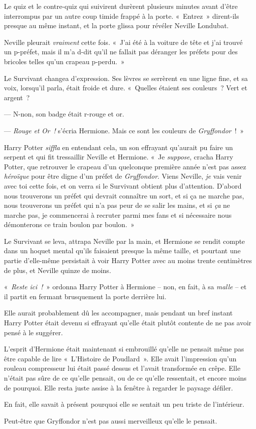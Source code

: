 Le quiz et le contre-quiz qui suivirent durèrent plusieurs minutes avant d'être interrompus par un autre coup timide frappé à la porte.
«~Entrez~» dirent-ils presque au même instant, et la porte glissa pour révéler Neville Londubat.

Neville pleurait \emph{vraiment} cette fois.
«~J'ai été à la voiture de tête et j'ai trouvé un p-préfet, mais il m'a d-dit qu'il ne fallait pas déranger les préfets pour des bricoles telles qu'un crapeau p-perdu.~»

Le Survivant changea d'expression.
Ses lèvres se serrèrent en une ligne fine, et sa voix, lorsqu'il parla, était froide et dure.
«~Quelles étaient ses couleurs~? Vert et argent~?

--- N-non, son badge était r-rouge et or.

--- \emph{Rouge et Or~!} s'écria Hermione. Mais ce sont les couleurs de \emph{Gryffondor}~!~»

Harry Potter \emph{siffla} en entendant cela, un son effrayant qu'aurait pu faire un serpent et qui fit tressaillir Neville et Hermione.
«~Je \emph{suppose}, cracha Harry Potter, que retrouver le crapeau d'un quelconque première année n'est pas assez \emph{héroïque} pour être digne d'un préfet de \emph{Gryffondor}.
Viens Neville, \emph{je} vais venir avec toi cette fois, et on verra si le Survivant obtient plus d'attention.
D'abord nous trouverons un préfet qui devrait connaître un sort, et si ça ne marche pas, nous trouverons un préfet qui n'a pas peur de se salir les mains, et si \emph{ça} ne marche pas, je commencerai à recruter parmi mes fans et si nécessaire nous démonterons ce train boulon par boulon.~»

Le Survivant se leva, attrapa Neville par la main, et Hermione se rendit compte dans un hoquet mental qu'ils faisaient presque la même taille, et pourtant une partie d'elle-même persistait à voir Harry Potter avec au moins trente centimètres de plus, et Neville quinze de moins.

«~\emph{Reste ici~!}~» ordonna Harry Potter à Hermione -- non, en fait, à sa \emph{malle} -- et il partit en fermant brusquement la porte derrière lui.

Elle aurait probablement dû les accompagner, mais pendant un bref instant Harry Potter était devenu si effrayant qu'elle était plutôt contente de ne pas avoir pensé à le suggérer.

L'esprit d'Hermione était maintenant si embrouillé qu'elle ne pensait même pas être capable de lire «~L'Histoire de Poudlard~».
Elle avait l'impression qu'un rouleau compresseur lui était passé dessus et l'avait transformée en crêpe.
Elle n'était pas sûre de ce qu'elle pensait, ou de ce qu'elle ressentait, et encore moins de pourquoi.
Elle resta juste assise à la fenêtre à regarder le paysage défiler.

En fait, elle savait à présent pourquoi elle se sentait un peu triste de l'intérieur.

Peut-être que Gryffondor n'est pas aussi merveilleux qu'elle le pensait.



